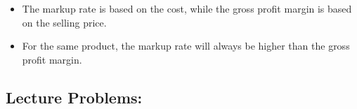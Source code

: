 \documentclass[
]{book}
\providecommand{\tightlist}{%
  \setlength{\itemsep}{0pt}\setlength{\parskip}{0pt}}
\begin{document}
\begin{enumerate}
\begin{itemize}
    \begin{itemize}
    \tightlist
    \item
      The markup rate is based on the cost, while the gross profit margin is based on the selling price.
    \item
      For the same product, the markup rate will always be higher than the gross profit margin.
    \end{itemize}
  \end{itemize}
\end{enumerate}

\subsection*{Lecture Problems:}\label{lecture-problems-3}
\end{document}
